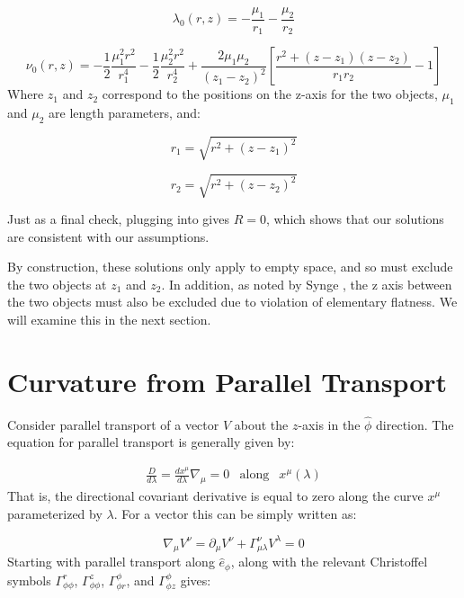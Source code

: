 \documentclass[12pt]{article}
\begin{document}
\begin{appendices}
\begin{equation}
\lambda_0(r,z)=-\frac{\mu_1}{r_1}-\frac{\mu_2}{r_2}
\end{equation}

\begin{equation}
  \nu_0(r,z)=-\frac{1}{2}\frac{\mu_{1}^{2}r^2}{r_{1}^{4}}-\frac{1}{2}\frac{\mu_{2}^{2}r^2}{r_{2}^{4}}+\frac{2\mu_1\mu_2}{(z_1-z_2)^2}\left[\frac{r^2+(z-z_1)(z-z_2)}{r_{1}r_{2}}-1\right]
\end{equation}
Where $z_1$ and $z_2$ correspond to the positions on the z-axis for the two objects, $\mu_1$ and $\mu_2$ are length parameters, and:

\begin{equation}
r_1=\sqrt{r^2+(z-z_1)^2}
\end{equation}

\begin{equation}
r_2=\sqrt{r^2+(z-z_2)^2}
\end{equation}

Just as a final check, plugging  into  gives $R=0$, which shows that our solutions are consistent with our assumptions.

By construction, these solutions only apply to empty space, and so must exclude the two objects at $z_1$ and $z_2$. In addition, as noted by Synge \cite{synge_relativity}, the z axis between the two objects must also be excluded due to violation of elementary flatness. We will examine this in the next section.

\section{Curvature from Parallel Transport}

Consider parallel transport of a vector $V$ about the $z$-axis in
the $\hat{\phi}$ direction. The equation for parallel transport is generally given by:
    
\begin{equation}
\begin{array}{rcl} \frac{D}{d\lambda}=\frac{dx^{\mu}}{d\lambda}\nabla_{\mu}=0 & \mbox{along} & x^{\mu}\left(\lambda\right)      
\end{array}
\end{equation}      
That is, the directional covariant derivative is equal to zero along
the curve $x^{\mu}$ parameterized by $\lambda$. For a vector this can
be simply written as:

\begin{equation}
\label{eq:x-par-xport}
\nabla_\mu V^{\nu}=\partial_\mu V^\nu+\Gamma^\nu_{\mu\lambda} V^\lambda=0
\end{equation}      
Starting with parallel transport along $\hat{e}_{\phi}$,  along with the relevant Christoffel symbols $\Gamma^{r}_{\phi\phi}$, $\Gamma^{z}_{\phi\phi}$, $\Gamma^{\phi}_{\phi r}$, and $\Gamma^{\phi}_{\phi z}$ gives:
      

\end{appendices}
\end{document}
